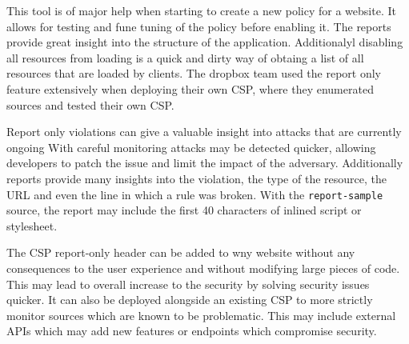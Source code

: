 \documentclass[11]{article}   %
\begin{document}

This tool is of major help when starting to create a new policy for a website.
It allows for testing and fune tuning of the policy before enabling it. 
The reports provide great insight into the structure of the application.
Additionalyl disabling all resources from loading is a quick and dirty way of obtaing a list of all resources that are loaded by clients.
The dropbox team used the report only feature extensively when deploying their own CSP, where they enumerated sources and tested their own CSP. 


Report only violations can give a valuable insight into attacks that are currently ongoing 
With careful monitoring attacks may be detected quicker, allowing developers to patch the issue and limit the impact of the adversary.
Additionally reports provide many insights into the violation, the type of the resource, the URL and even the line in which a rule was broken.
With the \texttt{report-sample} source, the report may include the first 40 characters of inlined script or stylesheet.

The CSP report-only header can be added to wny website without any consequences to the user experience and without modifying large pieces of code.
This may lead to overall increase to the security by solving security issues quicker.
It can also be deployed alongside an existing CSP to more strictly monitor sources which are known to be problematic.
This may include external APIs which may add new features or endpoints which compromise security.
\end{document}
